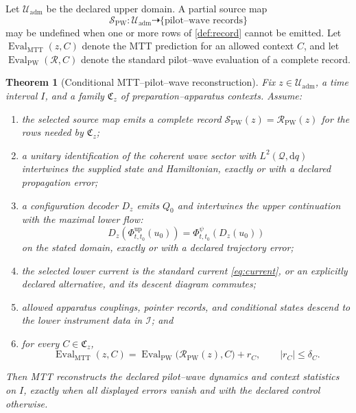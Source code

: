 \documentclass[11pt]{article}
\newtheorem{theorem}{Theorem}[section]
\theoremstyle{definition}
\theoremstyle{remark}
\newcommand{\cI}{\mathcal I}
\newcommand{\cQ}{\mathcal Q}
\newcommand{\cR}{\mathcal R}
\newcommand{\cS}{\mathcal S}
\newcommand{\cU}{\mathcal U}
\newcommand{\dd}{\mathrm d}
\let\MTToriginalitem\item
\renewcommand{\item}{\par\MTToriginalitem}
\begin{document}
Let \(\cU_{\mathrm{adm}}\) be the declared upper domain.  A partial source map
\[
\cS_{\mathrm{PW}}\colon
\cU_{\mathrm{adm}}\dashrightarrow
\{\text{pilot--wave records}\}
\]
may be undefined when one or more rows of \cref{def:record} cannot be
emitted.  Let
\(\operatorname{Eval}_{\mathrm{MTT}}(z,C)\) denote the MTT prediction for an
allowed context \(C\), and let
\(\operatorname{Eval}_{\mathrm{PW}}(\cR,C)\) denote the standard
pilot--wave evaluation of a complete record.

\begin{theorem}[Conditional MTT--pilot--wave reconstruction]
\label{thm:conditional}
Fix \(z\in\cU_{\mathrm{adm}}\), a time interval \(I\), and a family
\(\mathfrak C_z\) of preparation--apparatus contexts.  Assume:
\begin{enumerate}[label=(PW\arabic*),leftmargin=3em]
\item the selected source map emits a complete record
      \(\cS_{\mathrm{PW}}(z)=\cR_{\mathrm{PW}}(z)\) for the rows needed by
      \(\mathfrak C_z\);
\item a unitary identification of the coherent wave sector with
      \(L^2(\cQ,\dd q)\) intertwines the supplied state and Hamiltonian,
      exactly or with a declared propagation error;
\item a configuration decoder \(D_z\) emits \(Q_0\) and intertwines the
      upper continuation with the maximal lower flow:
      \[
      D_z\!\left(\Phi^{\mathrm{up}}_{t,t_0}(u_0)\right)
      =
      \Phi^{\psi}_{t,t_0}\!\left(D_z(u_0)\right)
      \]
      on the stated domain, exactly or with a declared trajectory error;
\item the selected lower current is the standard current
      \cref{eq:current}, or an explicitly declared alternative, and its
      descent diagram commutes;
\item allowed apparatus couplings, pointer records, and conditional states
      descend to the lower instrument data in \(\cI\); and
\item for every \(C\in\mathfrak C_z\),
      \[
      \operatorname{Eval}_{\mathrm{MTT}}(z,C)
      =
      \operatorname{Eval}_{\mathrm{PW}}
      \bigl(\cR_{\mathrm{PW}}(z),C\bigr)+r_C,
      \qquad |r_C|\leq\delta_C .
      \]
\end{enumerate}
Then MTT reconstructs the declared pilot--wave dynamics and context
statistics on \(I\), exactly when all displayed errors vanish and with the
declared control otherwise.
\end{theorem}
\end{document}
